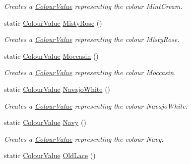 \begin{DoxyCompactItemize}
\begin{DoxyCompactList}\small\item\em Creates a \hyperlink{classMezzanine_1_1ColourValue}{ColourValue} representing the colour MintCream. \item\end{DoxyCompactList}\item 
static \hyperlink{classMezzanine_1_1ColourValue}{ColourValue} \hyperlink{classMezzanine_1_1ColourValue_af4c27551ce8d126404fa80e381b85ed0}{MistyRose} ()
\begin{DoxyCompactList}\small\item\em Creates a \hyperlink{classMezzanine_1_1ColourValue}{ColourValue} representing the colour MistyRose. \item\end{DoxyCompactList}\item 
static \hyperlink{classMezzanine_1_1ColourValue}{ColourValue} \hyperlink{classMezzanine_1_1ColourValue_a3698c1ffd2848a7e6c76e2ab3465396d}{Moccasin} ()
\begin{DoxyCompactList}\small\item\em Creates a \hyperlink{classMezzanine_1_1ColourValue}{ColourValue} representing the colour Moccasin. \item\end{DoxyCompactList}\item 
static \hyperlink{classMezzanine_1_1ColourValue}{ColourValue} \hyperlink{classMezzanine_1_1ColourValue_a521a8139996893d1e8c9df00b9afa9be}{NavajoWhite} ()
\begin{DoxyCompactList}\small\item\em Creates a \hyperlink{classMezzanine_1_1ColourValue}{ColourValue} representing the colour NavajoWhite. \item\end{DoxyCompactList}\item 
static \hyperlink{classMezzanine_1_1ColourValue}{ColourValue} \hyperlink{classMezzanine_1_1ColourValue_a181b891ffbba8ac99762b6c14a84d6de}{Navy} ()
\begin{DoxyCompactList}\small\item\em Creates a \hyperlink{classMezzanine_1_1ColourValue}{ColourValue} representing the colour Navy. \item\end{DoxyCompactList}\item 
static \hyperlink{classMezzanine_1_1ColourValue}{ColourValue} \hyperlink{classMezzanine_1_1ColourValue_a47f6636eeda8c52f5af0ded57ffca3d1}{OldLace} ()

\end{DoxyCompactItemize}
